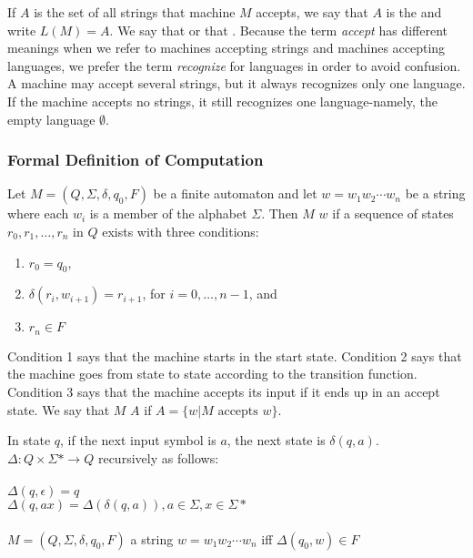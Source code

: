\documentclass{article}
\begin{document}
If $A$ is the set of all strings that machine $M$ accepts, we say that $A$ is the  and write $L(M) = A$. We say that  or that . Because the term \emph{accept} has different meanings when we refer to machines accepting strings and machines accepting languages, we prefer the term \emph{recognize} for languages in order to avoid confusion. \\ 

A machine may accept several strings, but it always recognizes only one language. If the machine accepts no strings, it still recognizes one language-namely, the empty language  $\emptyset$. 

\subsubsection{Formal Definition of Computation}

Let $M = (Q, \Sigma, \delta, q_{0}, F)$ be a finite automaton and let $w=w_{1}w_{2} \cdots w_{n}$ be a string where each $w_{i}$ is a member of the alphabet $\Sigma$. Then $M$  $w$ if a sequence of states $r_{0}, r_{1}, \dots, r_{n}$ in $Q$ exists with three conditions:

\begin{enumerate}
  \item $r_0 = q_0$,
  \item $\delta(r_{i},w_{i+1}) = r_{i+1}$, for $i=0, \dots, n-1$, and 
  \item $r_{n} \in F$
\end{enumerate}

Condition 1 says that the machine starts in the start state. Condition 2 says that the machine goes from state to state according to the transition function. Condition 3 says that the machine accepts its input if it ends up in an accept state. We say that $M$  $A$ if $A = \{w \vert M \textrm{ accepts } w \}$. 

\begin{definition}
  In state $q$, if the next input symbol is $a$, the next state is $\delta(q,a)$. \\ 
   $\Delta: Q \times \Sigma * \rightarrow Q$ recursively as follows: \\  \\ 
    $\Delta(q,\epsilon) = q$ \\ 
    $\Delta(q,ax) = \Delta(\delta(q,a)), a \in \Sigma, x \in \Sigma *$ \\ \\
  $M = (Q,\Sigma,\delta, q_0, F)$  a string $w = w_{1}w_{2} \cdots w_{n}$ iff $\Delta(q_{0},w) \in F$
\end{definition}
\end{document}
